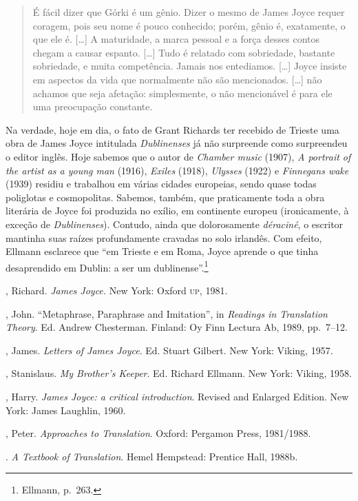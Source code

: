 \begin{quote}
É fácil dizer que Górki é um gênio. Dizer o mesmo de James Joyce requer coragem,
pois seu nome é pouco conhecido; porém, gênio é, exatamente, o que ele é. [\ldots{}]
A maturidade, a marca pessoal e a força desses contos chegam a causar espanto.
[\ldots{}] Tudo é relatado com sobriedade, bastante sobriedade, e muita competência.
Jamais nos entediamos. [\ldots{}] Joyce insiste em aspectos da vida que normalmente
não são mencionados. [\ldots{}] não achamos que seja afetação: simplesmente, o não
mencionável é para ele uma preocupação constante.
\end{quote}

Na verdade, hoje em dia, o fato de Grant Richards ter recebido de Trieste uma
obra de James Joyce intitulada \textit{Dublinenses} já não surpreende como
surpreendeu o editor inglês. Hoje sabemos que o autor de \textit{Chamber music}
(1907), \textit{A portrait of the artist as a young man} (1916),
\textit{Exiles} (1918), \textit{Ulysses} (1922) e \textit{Finnegans wake}
(1939) residiu e trabalhou em várias cidades europeias, sendo quase todas
poliglotas e cosmopolitas. Sabemos, também, que praticamente toda a obra
literária de Joyce foi produzida no exílio, em continente europeu (ironicamente,
à exceção de \textit{Dublinenses}). Contudo, ainda que dolorosamente
\textit{déraciné}, o escritor mantinha suas raízes profundamente cravadas no
solo irlandês. Com efeito, Ellmann esclarece que “em Trieste e em Roma, Joyce
aprende o que tinha desaprendido em Dublin: a ser um dublinense”.\footnote{ Ellmann, p.~263.}


\begin{bibliohedra}
, Richard. \textit{James Joyce.} New York: Oxford \textsc{up},
1981.

, John. “Metaphrase, Paraphrase and Imitation”, in
\textit{Readings in Translation Theory}. Ed. Andrew Chesterman.  Finland: Oy
Finn Lectura Ab, 1989, pp.~7--12.

, James. \textit{Letters of James Joyce}. Ed. Stuart Gilbert. New
York: Viking, 1957.

, Stanislaus. \textit{My Brother’s Keeper}. Ed. Richard Ellmann.
New York: Viking, 1958.

, Harry. \textit{James Joyce: a critical introduction}. Revised
and Enlarged Edition. New York: James Laughlin, 1960.

, Peter. \textit{Approaches to Translation}. Oxford: Pergamon
Press, 1981/1988.

\titidem. \textit{A Textbook of Translation}. Hemel Hempstead: Prentice Hall,
1988b.

\end{bibliohedra}

